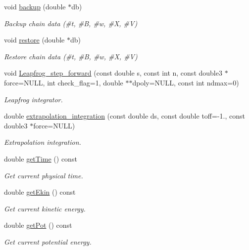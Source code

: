 \begin{DoxyCompactItemize}
void \hyperlink{classARC_1_1chain_a587009b6c6db0490c0f335aba732d77a}{backup} (double $\ast$db)
\begin{DoxyCompactList}\small\item\em Backup chain data (\#t, \#B, \#w, \#X, \#V) \end{DoxyCompactList}\item 
void \hyperlink{classARC_1_1chain_a2e7873b3a50ba9276d9a7595cb1d768d}{restore} (double $\ast$db)
\begin{DoxyCompactList}\small\item\em Restore chain data (\#t, \#B, \#w, \#X, \#V) \end{DoxyCompactList}\item 
void \hyperlink{classARC_1_1chain_a82b26731761231d86fd2e0b4529df6fa}{Leapfrog\+\_\+step\+\_\+forward} (const double s, const int n, const double3 $\ast$force=N\+U\+LL, int check\+\_\+flag=1, double $\ast$$\ast$dpoly=N\+U\+LL, const int ndmax=0)
\begin{DoxyCompactList}\small\item\em Leapfrog integrator. \end{DoxyCompactList}\item 
double \hyperlink{classARC_1_1chain_ab831215debbd09466cadb1b961dd0a18}{extrapolation\+\_\+integration} (const double ds, const double toff=-\/1., const double3 $\ast$force=N\+U\+LL)
\begin{DoxyCompactList}\small\item\em Extrapolation integration. \end{DoxyCompactList}\item 
double \hyperlink{classARC_1_1chain_a48bde99d89b99df54844e1331d4814bb}{get\+Time} () const
\begin{DoxyCompactList}\small\item\em Get current physical time. \end{DoxyCompactList}\item 
double \hyperlink{classARC_1_1chain_ad7e8b3a20521f095a6935845f8a2ee53}{get\+Ekin} () const
\begin{DoxyCompactList}\small\item\em Get current kinetic energy. \end{DoxyCompactList}\item 
double \hyperlink{classARC_1_1chain_ae59c00c676af34f22c650076eb0aa83a}{get\+Pot} () const
\begin{DoxyCompactList}\small\item\em Get current potential energy. \end{DoxyCompactList}\item 
$$
\end{DoxyCompactItemize}
